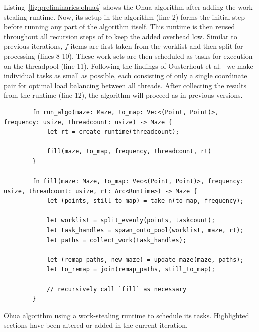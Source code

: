 Listing~\ref{fig:preliminaries:ohua4} shows the Ohua algorithm after adding the work-stealing runtime.
Now, its setup in the algorithm  (line 2) forms the initial step before running any part of the algorithm itself.
This runtime is then reused throughout all recursion steps of  to keep the added overhead low.
Similar to previous iterations, $f$ items are first taken from the worklist and then split for processing (lines 8-10).
These work sets are then scheduled as tasks for execution on the threadpool (line 11).
Following the findings of Ousterhout et al.~\cite{ousterhout2013case} we make individual tasks as small as possible, each consisting of only a single coordinate pair for optimal load balancing between all threads.
After collecting the results from the runtime (line 12), the algorithm will proceed as in previous versions.

\begin{listing}[t]
    \begin{verbatim}
        fn run_algo(maze: Maze, to_map: Vec<(Point, Point)>, frequency: usize, threadcount: usize) -> Maze {
            let rt = create_runtime(threadcount);

            fill(maze, to_map, frequency, threadcount, rt)
        }

        fn fill(maze: Maze, to_map: Vec<(Point, Point)>, frequency: usize, threadcount: usize, rt: Arc<Runtime>) -> Maze {
            let (points, still_to_map) = take_n(to_map, frequency);

            let worklist = split_evenly(points, taskcount);
            let task_handles = spawn_onto_pool(worklist, maze, rt);
            let paths = collect_work(task_handles);
        
            let (remap_paths, new_maze) = update_maze(maze, paths);
            let to_remap = join(remap_paths, still_to_map);
        
            // recursively call `fill` as necessary
        }
    \end{verbatim}
    \caption{Ohua algorithm using a work-stealing runtime to schedule its tasks. Highlighted sections have been altered or added in the current iteration.}%
    \label{fig:preliminaries:ohua4}
\end{listing}

